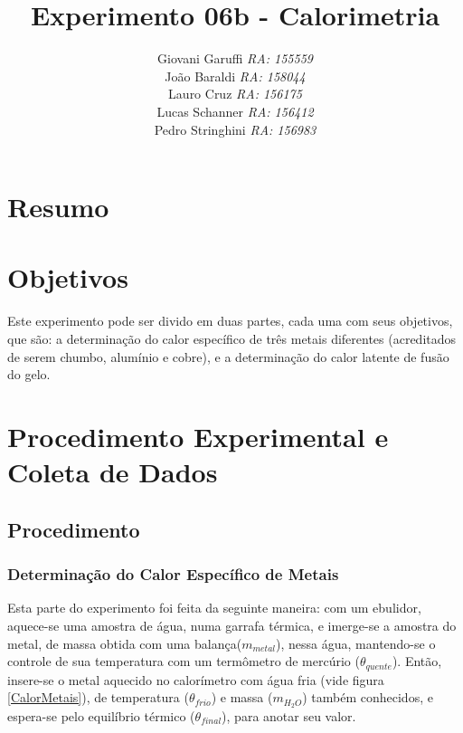 \documentclass[12pt,a4paper]{article}
\begin{document}
\title{\vspace{70mm}\Huge Experimento 06b - Calorimetria}
\author{ Giovani Garuffi\qquad\hfill
		\textit {RA: 155559}\protect\\
		João Baraldi\hfill
		\textit{RA: 158044}\protect\\
		Lauro Cruz\hfill
		\textit{RA: 156175}\protect\\
		Lucas Schanner\hfill
		\textit{RA: 156412}\protect\\
		Pedro Stringhini\hfill
		\textit {RA: 156983}								
		}
\maketitle
\newpage
\section{Resumo}

\section{Objetivos}
Este experimento pode ser divido em duas partes, cada uma com seus objetivos, que são: a determinação do calor específico de três metais diferentes (acreditados de serem chumbo, alumínio e cobre), e a determinação do calor latente de fusão do gelo. 


\section{Procedimento Experimental e Coleta de Dados}


\subsection{Procedimento}


\subsubsection{Determinação do Calor Específico de Metais}

Esta parte do experimento foi feita da seguinte maneira: com um ebulidor, aquece-se uma amostra de água, numa garrafa térmica, e imerge-se a amostra do metal, de massa obtida com uma balança($m_{metal}$), nessa água, mantendo-se o controle de sua temperatura com um termômetro de mercúrio ($\theta_{quente}$). Então, insere-se o metal aquecido no calorímetro com água fria (vide figura \ref{CalorMetais}), de temperatura ($\theta_{frio}$) e massa ($m_{H_2O}$) também conhecidos, e espera-se pelo equilíbrio térmico ($\theta_{final}$), para anotar seu valor.
\end{document}
